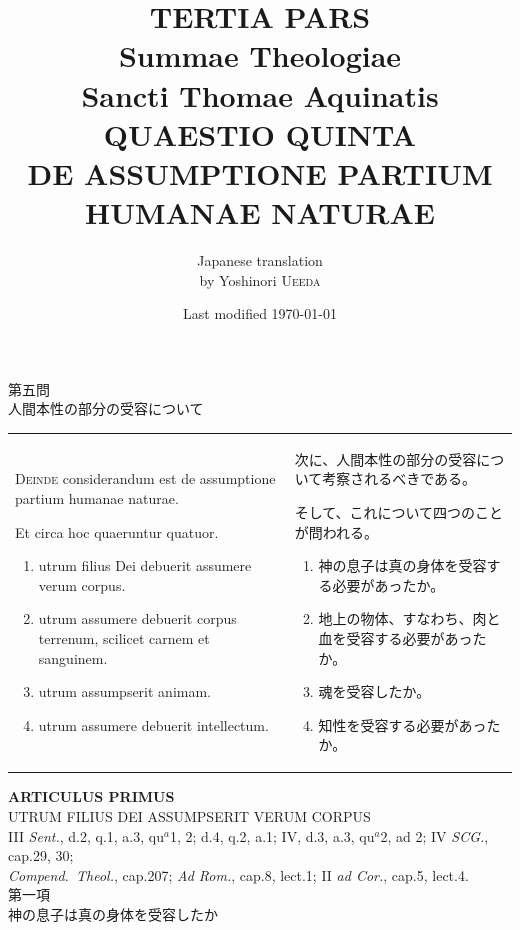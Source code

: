 \documentclass[paper=a4paper,fontsize=10pt,jafontsize=9pt,titlepage]{jlreq}
\title{{\bfseries TERTIA PARS}\\{\Huge Summae Theologiae}\\Sancti Thomae
Aquinatis\\{\sffamily QUAESTIO QUINTA}\\DE ASSUMPTIONE PARTIUM HUMANAE NATURAE}
\author{Japanese translation\\by Yoshinori {\scshape Ueeda}}
\date{Last modified \today}
\begin{document}
\maketitle
\pagestyle{fancy}

\begin{center}
{\Large 第五問\\人間本性の部分の受容について}
\end{center}

\begin{longtable}{p{21em}p{21em}}


{\Huge D}{\scshape einde} considerandum est de assumptione partium
 humanae naturae. 

Et circa hoc quaeruntur quatuor. 

\begin{enumerate}
 \item utrum filius Dei debuerit assumere verum corpus.
 \item utrum assumere debuerit corpus terrenum, scilicet carnem et
       sanguinem.
 \item utrum assumpserit animam.
 \item utrum assumere debuerit intellectum.
\end{enumerate}


&

次に、人間本性の部分の受容について考察されるべきである。

そして、これについて四つのことが問われる。

\begin{enumerate}
 \item 神の息子は真の身体を受容する必要があったか。
 \item 地上の物体、すなわち、肉と血を受容する必要があったか。
 \item 魂を受容したか。
 \item 知性を受容する必要があったか。
\end{enumerate}


\end{longtable}

\newpage




\begin{center}
 {\Large {\bfseries ARTICULUS PRIMUS}}\\
 {\large UTRUM FILIUS DEI ASSUMPSERIT VERUM CORPUS}\\
 {\footnotesize III {\itshape Sent.}, d.2, q.1, a.3, qu$^a$1, 2; d.4,
 q.2, a.1; IV, d.3, a.3, qu$^a$2, ad 2; IV {\itshape SCG.}, cap.29, 30;
 \\{\itshape Compend.~Theol.}, cap.207; {\itshape Ad Rom.}, cap.8, lect.1;
 II {\itshape ad Cor.}, cap.5, lect.4.}\\
 {\Large 第一項\\神の息子は真の身体を受容したか}
\end{center}
\end{document}
